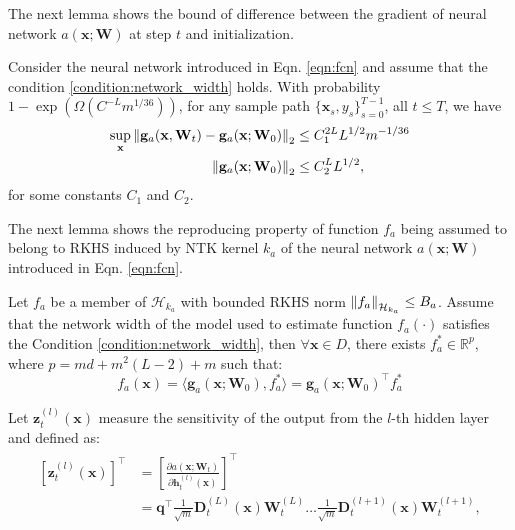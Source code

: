 The next lemma shows the bound of difference between the gradient of neural network $a(\mathbf{x}; \mathbf{W})$ at step $t$ and initialization.
\begin{auxlemma} Consider the neural network introduced in Eqn. \ref{eqn:fcn} and assume that the condition \ref{condition:network_width} holds. With probability $1 - \exp (\Omega(C^{-L} m^{1/36}))$, for any sample path $\{ \mathbf{x}_s, y_s\}_{s=0}^{T-1}$, all $t\le T$, we have
\begin{align*}
\begin{split}
    \sup_\mathbf{x} \norm{\mathbf{g}_{a} (\mathbf{x}, \mathbf{W}_t) - \mathbf{g}_{a}(\mathbf{x}; \mathbf{W}_0)}_2 & \le C_1^{2L} L^{1/2}m^{-1/36}
    \\
    \norm{\mathbf{g}_{a}(\mathbf{x}; \mathbf{W}_0)}_2 &\le C_2^L L^{1/2}  ,
\end{split}    
\end{align*}
for some constants $C_1$ and $C_2$. 
\end{auxlemma}
The next lemma shows the reproducing property of function $f_a$ being assumed to belong to RKHS induced by NTK kernel $k_a$ of the neural network $a(\mathbf{x}; \mathbf{W})$ introduced in Eqn. \ref{eqn:fcn}.
\begin{auxlemma}
    \label{lemma:neural_cbo_RKHS_expression}
    Let $f_a$ be a member of $\mathcal{H}_{k_a}$ with bounded RKHS norm $\norm{f_a}_{\mathcal{H}_{k_a}} \le B_a$. Assume that the network width of the model used to estimate function $f_a (\cdot)$ satisfies the Condition \ref{condition:network_width}, 
    then $\forall \mathbf{x} \in D$, there exists $f_a^* \in \mathbb{R}^p$, where $p=md+m^2(L-2)+m$ such that:
    \[
    f_a(\mathbf{x}) = \langle \mathbf{g}_a(\mathbf{x}; \mathbf{W}_0), f_a^* \rangle = \mathbf{g}_a(\mathbf{x}; \mathbf{W}_0)^\top f_a^*
    \]


\end{auxlemma}
Let $\mathbf{z}_t^{(l)} (\mathbf{x})$ measure the sensitivity of the output from the $l$-th hidden layer and defined as:
\begin{align*}
    \begin{split}
        [\mathbf{z}_t^{(l)}(\mathbf{x})]^\top &= \left [ \frac{\partial a(\mathbf{x}; \mathbf{W}_t)}{\partial \mathbf{h}_t^{(l)}(\mathbf{x})}\right]^\top \\
        &= \mathbf{q}^\top \frac{1}{\sqrt{m}} \mathbf{D}_t^{(L)}(\mathbf{x}) \mathbf{W}_t^{(L)} \dots \frac{1}{\sqrt{m}} \mathbf{D}_t^{(l+1)}(\mathbf{x}) \mathbf{W}_t^{(l+1)}, 
    \end{split} 
\end{align*}
